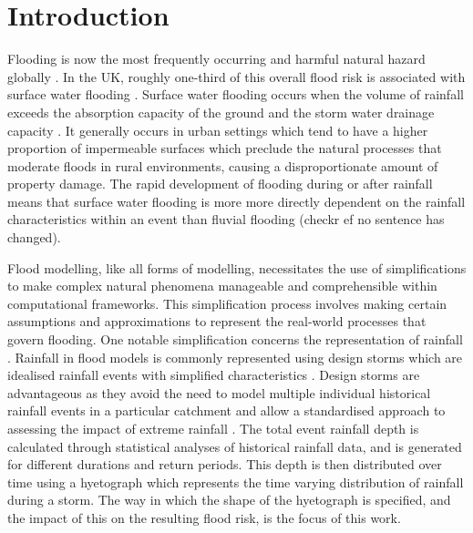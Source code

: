 \documentclass[APA,Times2COL]{WileyNJDv5}
\begin{document}



\section{Introduction}\label{sec:introduction}

Flooding is now the most frequently occurring and harmful natural hazard globally \citep{jenkins2018probabilistic, razavi2020anthropocene}. In the UK, roughly one-third of this overall flood risk is associated with surface water flooding \citep{houston2011pluvial}. Surface water flooding occurs when the volume of rainfall exceeds the absorption capacity of the ground and the storm water drainage capacity \citep{archer_characterising_2015}. It generally occurs in urban settings which tend to have a higher proportion of impermeable surfaces which preclude the natural processes that moderate floods in rural environments, causing a disproportionate amount of property damage. The rapid development of flooding during or after rainfall means that
surface water flooding is more more directly dependent on the rainfall characteristics within an event than fluvial flooding \citep{ochoa2015impact} (checkr ef no sentence has changed). 

Flood modelling, like all forms of modelling, necessitates the use of simplifications to make complex natural phenomena manageable and comprehensible within computational frameworks. This simplification process involves making certain assumptions and approximations to represent the real-world processes that govern flooding. One notable simplification concerns the representation of rainfall \citep{bardossy2022precipitation}. Rainfall in flood models is commonly represented using design storms which are idealised rainfall events with simplified characteristics \citep{butler_urban_2004}. Design storms are advantageous as they avoid the need to model multiple individual historical rainfall events in a particular catchment and allow a standardised approach to assessing the impact of extreme rainfall \citep{balbastre2019comparison, marsalek1984design}. The total event rainfall depth is calculated through statistical analyses of historical rainfall data, and is generated for different durations and return periods. This depth is then distributed over time using a hyetograph which represents the time varying distribution of rainfall during a storm. The way in which the shape of the hyetograph is specified, and the impact of this on the resulting flood risk, is the focus of this work.
\end{document}
